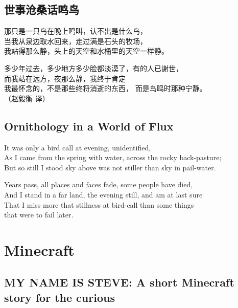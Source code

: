 \documentclass[
]{book}
\renewenvironment{quote}{\begin{VF}}{\end{VF}}
\begin{document}
\hypertarget{section-66}{%
\section{世事沧桑话鸣鸟}\label{section-66}}

\begin{quote}
那只是一只鸟在晚上鸣叫，认不出是什么鸟，\\
当我从泉边取水回来，走过满是石头的牧场，\\
我站得那么静，头上的天空和水桶里的天空一样静。

多少年过去，多少地方多少脸都淡漠了，有的人已谢世，\\
而我站在远方，夜那么静，我终于肯定\\
我最怀念的，不是那些终将消逝的东西， 而是鸟鸣时那种宁静。\\
（赵毅衡 译）
\end{quote}

\hypertarget{ornithology-in-a-world-of-flux}{%
\section{Ornithology in a World of Flux}\label{ornithology-in-a-world-of-flux}}

\begin{quote}
It was only a bird call at evening, unidentified,\\
As I came from the spring with water, across the rocky back-pasture;\\
But so still I stood sky above was not stiller than sky in pail-water.

Years pass, all places and faces fade, some people have died,\\
And I stand in a far land, the evening still, and am at last sure\\
That I miss more that stillness at bird-call than some things\\
that were to fail later.
\end{quote}

\hypertarget{minecraft}{%
\chapter{Minecraft}\label{minecraft}}

\hypertarget{my-name-is-steve-a-short-minecraft-story-for-the-curious}{%
\section{MY NAME IS STEVE: A short Minecraft story for the curious}\label{my-name-is-steve-a-short-minecraft-story-for-the-curious}}
\end{document}
